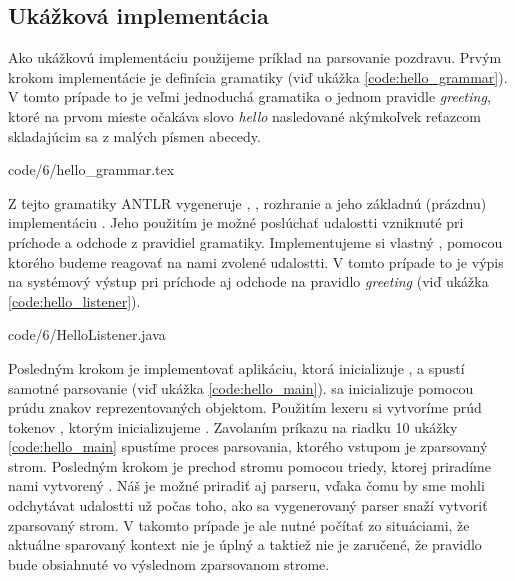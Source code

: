 \subsection{Ukážková implementácia}\label{basic_implementation}
Ako ukážkovú implementáciu použijeme príklad na parsovanie pozdravu. Prvým krokom implementácie je definícia gramatiky (viď ukážka \ref{code:hello_grammar}). V tomto prípade to je veľmi jednoduchá gramatika o jednom pravidle \textit{greeting}, ktoré na prvom mieste očakáva slovo \textit{hello} nasledované akýmkoľvek reťazcom skladajúcim sa z malých písmen abecedy.


            {code/6/hello_grammar.tex}

Z tejto gramatiky ANTLR vygeneruje , , rozhranie  a jeho základnú (prázdnu) implementáciu . Jeho použitím je možné poslúchať udalostti vzniknuté pri príchode a odchode z pravidiel gramatiky. Implementujeme si vlastný , pomocou ktorého budeme reagovať na nami zvolené udalostti. V tomto prípade to je výpis na systémový výstup pri príchode aj odchode na pravidlo \textit{greeting} (viď ukážka \ref{code:hello_listener}).


            {code/6/HelloListener.java}

Posledným krokom je implementovať aplikáciu, ktorá inicializuje ,  a spustí samotné parsovanie (viď ukážka \ref{code:hello_main}).  sa inicializuje pomocou prúdu znakov reprezentovaných  objektom. Použitím lexeru si vytvoríme prúd tokenov , ktorým inicializujeme . Zavolaním príkazu na riadku 10 ukážky \ref{code:hello_main} spustíme proces parsovania, ktorého vstupom je zparsovaný strom. Posledným krokom je prechod stromu pomocou  triedy, ktorej priradíme nami vytvorený . Náš  je možné priradiť aj parseru, vďaka čomu by sme mohli odchytávat udalostti už počas toho, ako sa vygenerovaný parser snaží vytvoriť zparsovaný strom. V takomto prípade je ale nutné počítať zo situáciami, že aktuálne sparovaný kontext nie je úplný a taktiež nie je zaručené, že pravidlo bude obsiahnuté vo výslednom zparsovanom strome. 

